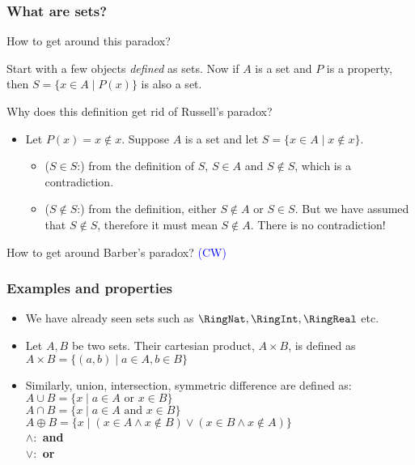  \begin{frame}[fragile]
\frametitle{What are sets?}

How to get around this paradox?
\begin{definition}
Start with a few objects {\it defined} as sets. Now if $A$ is a set and $P$ is a property, 
then $S = \{x \in A \mid P(x)\}$ is also a set. 
\end{definition}

Why does this definition get rid of Russell's paradox?

\begin{itemize}
\item Let $P(x) = x \notin x$. Suppose $A$ is a set and let $S = \{x \in A \mid x \notin x\}$.


\begin{itemize}
\item ($S \in S$:) from the definition of $S$, $S \in A$ and $S \notin S$, which is a contradiction.
\item ($S \notin S$:) from the definition, either $S \notin A$ or $S \in S$. But we have assumed that $S \notin S$, therefore it must mean $S \notin A$.  There is no contradiction!
\end{itemize}

\end{itemize}



How to get around Barber's paradox? \textcolor{blue}{(CW)}

\end{frame}

 \begin{frame}[fragile]
\frametitle{Examples and properties}
\begin{itemize}
\item We have already seen sets such as $\RingNat, \RingInt, \RingReal$ etc. 

\item Let $A,B$ be two sets. Their cartesian product, $A\times B$, is defined as \\
$A \times B = \{(a,b) \mid a \in A, b \in B\}$
\item Similarly, union, intersection, symmetric difference are defined as:\\
$A \cup B = \{x \mid a \in A \mbox { or } x \in B\}$\\
$A \cap B = \{x \mid a \in A \mbox { and } x \in B\}$\\
$A \oplus B = \{x \mid (x \in A \wedge x \notin B) \vee (x \in B \wedge x \notin A)\}$\\


\textbf{
$\wedge:$ and\\
$\vee:$ or}



\end{itemize}

\end{frame}


